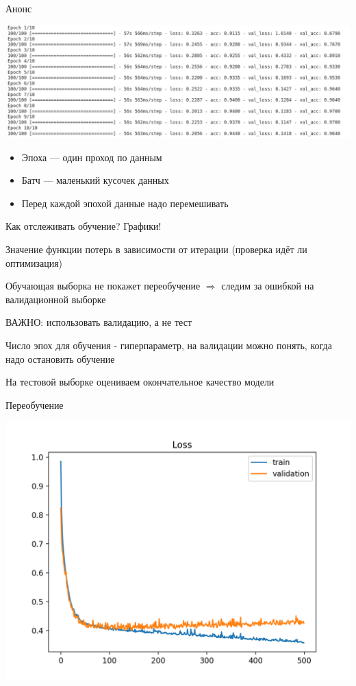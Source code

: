 \documentclass[notes,12pt, aspectratio=169]{beamer}
\newenvironment{wideitemize}{\itemize\addtolength{\itemsep}{10pt}}{\enditemize}
\begin{document}
\begin{frame}{Анонс}
	\begin{center}
		\includegraphics[width=.95\linewidth]{epoch_batch.png}
	\end{center}
	\begin{itemize}
		\item \alert{Эпоха} — один проход по данным 
		\item \alert{Батч} — маленький кусочек данных
		\item \alert{Перед каждой эпохой данные надо перемешивать}
	\end{itemize}
\end{frame}


\begin{frame}{Как отслеживать обучение? Графики!}
\begin{wideitemize}
	\item Значение функции потерь в зависимости от итерации (проверка идёт ли оптимизация)
	
	\item Обучающая выборка не покажет переобучение $\Rightarrow$ следим за ошибкой на валидационной выборке
	
	\item \alert{ВАЖНО:}  использовать валидацию, а не тест
	
	\item Число эпох для обучения - гиперпараметр, на валидации можно понять, когда надо остановить обучение
	
	\item На тестовой выборке оцениваем окончательное качество модели	
\end{wideitemize}
\end{frame}


\begin{frame}{Переобучение}
\begin{center}
	\includegraphics[width=.7\linewidth]{overfitting.png}
\end{center}
\end{frame}
\end{document}
